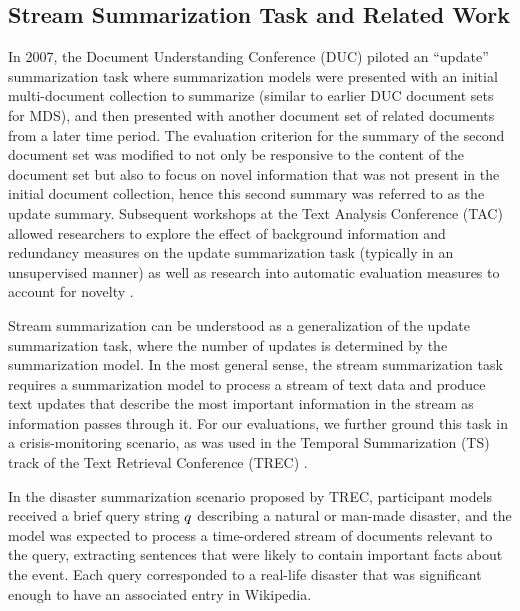 \subsection{Stream Summarization Task and Related Work}

In 2007, the Document Understanding Conference (DUC) piloted an ``update'' 
summarization task \citep{dang2008overview} where summarization models
were presented with an initial multi-document collection
to summarize (similar to earlier DUC document sets for MDS), and then
presented with another document set of related documents from a later time
period. The evaluation criterion for the summary of the second 
document set was modified to not only be responsive to the content of the
document set but also to focus on novel information that was not present in 
the initial document collection, hence this second summary was referred to
as the update summary. Subsequent workshops at the Text Analysis Conference
(TAC) allowed researchers to explore the effect of background information
and redundancy measures on the update summarization task (typically in an
unsupervised manner) 
\citep{chen2008tsinghua,he2008hitir,mohammad2008multiple,zhang2008ictcas} as well as research
into automatic evaluation measures to account for novelty 
\citep{conroy2011nouveau}.

Stream summarization can be understood as a generalization of the update
summarization task, where the number of updates is determined by the 
summarization model.
In the most general sense, the stream summarization task requires a 
summarization model to process a stream of text data and produce text updates
that describe the most important information in the
stream as information passes through it. 
For our evaluations, we further ground this task in a crisis-monitoring
scenario, as was used in the Temporal Summarization (TS) track 
of the Text Retrieval Conference (TREC)
\citep{aslam2015trec,aslam2016trec}.

In the disaster summarization scenario proposed by TREC,
 participant models received a brief query string 
$q{}$ describing a natural or man-made disaster, and the model was 
expected to process a time-ordered stream of documents relevant to the query, 
extracting sentences that were likely to contain important facts about the
event. Each query corresponded to a real-life disaster that was significant
enough to have an associated entry in Wikipedia. 







